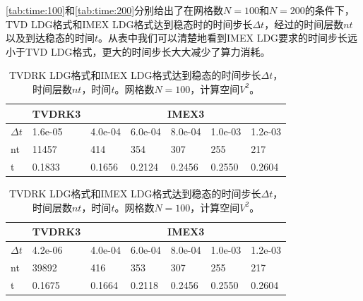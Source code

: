 \autoref{tab:time:100}和\autoref{tab:time:200}分别给出了在网格数$N=100$和$N=200$的条件下，TVD LDG格式和IMEX LDG格式达到稳态时的时间步长$\Delta t$，经过的时间层数$nt$以及到达稳态的时间$t$。从表中我们可以清楚地看到IMEX LDG要求的时间步长远小于TVD LDG格式，更大的时间步长大大减少了算力消耗。
\begin{table}
    \centering
    \begin{tabularx}{\textwidth}{@{} *7{X} @{}}
        \toprule
                   & \multicolumn{1}{c}{TVDRK3} & \multicolumn{5}{c}{IMEX3}                                         \\
        \cmidrule(lr){2-2} \cmidrule(lr){3-7}
        \midrule
        $\Delta t$ & 1.6e-05                    & 4.0e-04                   & 6.0e-04 & 8.0e-04 & 1.0e-03 & 1.2e-03 \\
        nt         & 11457                      & 414                       & 354     & 307     & 255     & 217     \\
        t          & 0.1833                     & 0.1656                    & 0.2124  & 0.2456  & 0.2550  & 0.2604  \\
        \bottomrule
    \end{tabularx}
    \caption{TVDRK LDG格式和IMEX LDG格式达到稳态的时间步长$\Delta t$，时间层数$nt$，时间$t$。网格数$N=100$，计算空间$V^2$。}
    \label{tab:time:100}
\end{table}
\begin{table}
    \begin{tabularx}{\textwidth}{@{} *7{X} @{}}
        \toprule
                   & \multicolumn{1}{c}{TVDRK3} & \multicolumn{5}{c}{IMEX3}                                         \\
        \cmidrule(lr){2-2} \cmidrule(lr){3-7}
        \midrule
        $\Delta t$ & 4.2e-06                    & 4.0e-04                   & 6.0e-04 & 8.0e-04 & 1.0e-03 & 1.2e-03 \\
        nt         & 39892                      & 416                       & 353     & 307     & 255     & 217     \\
        t          & 0.1675                     & 0.1664                    & 0.2118  & 0.2456  & 0.2550  & 0.2604  \\
        \bottomrule
    \end{tabularx}
    \caption{TVDRK LDG格式和IMEX LDG格式达到稳态的时间步长$\Delta t$，时间层数$nt$，时间$t$。网格数$N=100$，计算空间$V^2$。}
    \label{tab:time:200}
\end{table}

